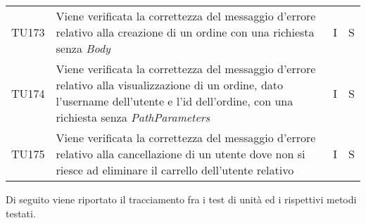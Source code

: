 {\begin{longtable}{C{2cm} C{9.6cm} C{1.5cm} C{1cm}}
TU173 & Viene verificata la correttezza del messaggio d'errore relativo alla creazione di un ordine con una richiesta senza \textit{Body} & I & S\\

TU174 & Viene verificata la correttezza del messaggio d'errore relativo alla visualizzazione di un ordine, dato l'username dell'utente e l'id dell'ordine, con una richiesta senza \textit{PathParameters} & I & S\\

TU175 & Viene verificata la correttezza del messaggio d'errore relativo alla cancellazione di un utente dove non si riesce ad eliminare il carrello dell'utente relativo & I & S\\



\end{longtable}

}

Di seguito viene riportato il tracciamento fra i test di unità ed i rispettivi metodi testati.

